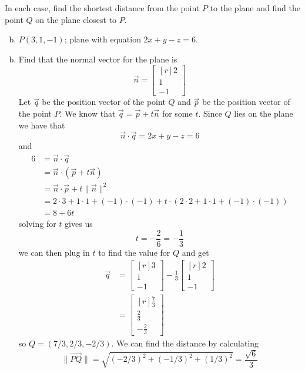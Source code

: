 \documentclass[../main.tex]{subfiles}
\begin{document}
In each case, find the shortest distance from the point $P$ to the plane and find the point $Q$ on the plane closest to $P$.
\begin{enumerate}[a)]
	\setcounter{enumi}{1}
	\item $P(3, 1, -1)$; plane with equation $2x + y - z = 6$.
\end{enumerate}

\solution
\begin{enumerate}[a)]
	\setcounter{enumi}{1}
	\item Find that the normal vector for the plane is 
		\[ \vec{n} = \begin{bmatrix*}[r]2\\1\\-1\end{bmatrix*} \]
		Let $\vec{q}$ be the position vector of the point $Q$ and $\vec{p}$ be
		the position vector of the point $P$. We know that $\vec{q} = \vec{p}+t\vec{n}$ for some $t$.
		Since $Q$ lies on the plane we have that 
		\[ \vec{n} \cdot \vec{q} = 2x + y - z = 6 \]
		and
		\begin{align*} 
			6 &= \vec{n} \cdot \vec{q}\\ 
			  &= \vec{n} \cdot (\vec{p} + t\vec{n})\\
			  &= \vec{n} \cdot \vec{p} + t\| \vec{n} \|^2\\
			  &= 2 \cdot 3 + 1 \cdot 1 + (-1) \cdot (-1) + t \cdot (2 \cdot 2+1 \cdot 1+(-1) \cdot (-1))\\
			  &= 8+6t
		\end{align*}
		solving for $t$ gives us
		\[ t = -\frac{2}{6} = -\frac{1}{3} \]
		we can then plug in $t$ to find the value for $Q$ and get
		\begin{align*}
			\vec{q} &= \begin{bmatrix*}[r]3\\1\\-1\end{bmatrix*}-\frac{1}{3}\begin{bmatrix*}[r]2\\1\\-1\end{bmatrix*}\\
			        &= \begin{bmatrix*}[r]\frac{7}{3}\\\frac{2}{3}\\-\frac{2}{3}\end{bmatrix*}
		\end{align*}
		so $Q = (7/3, 2/3, -2/3)$. We can find the distance by calculating
		\[ \|\overrightarrow{PQ}\| = \sqrt{(-2/3)^2 + (-1/3)^2 + (1/3)^2} = \frac{\sqrt{6}}{3} \]
\end{enumerate}
\end{document}
